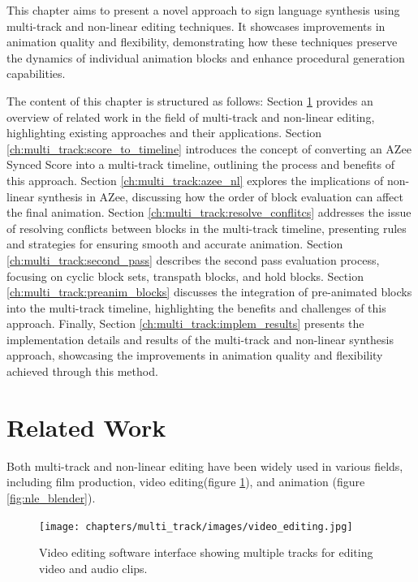 \documentclass[../../main.tex]{subfiles}
\begin{document}
This chapter aims to present a novel approach to sign language synthesis using multi-track and non-linear editing techniques. It showcases improvements in animation quality and flexibility, demonstrating how these techniques preserve the dynamics of individual animation blocks and enhance procedural generation capabilities.

The content of this chapter is structured as follows: Section \ref{ch:multi_track:related_work} provides an overview of related work in the field of multi-track and non-linear editing, highlighting existing approaches and their applications. Section \ref{ch:multi_track:score_to_timeline} introduces the concept of converting an AZee Synced Score into a multi-track timeline, outlining the process and benefits of this approach. Section \ref{ch:multi_track:azee_nl} explores the implications of non-linear synthesis in AZee, discussing how the order of block evaluation can affect the final animation. Section \ref{ch:multi_track:resolve_conflitcs} addresses the issue of resolving conflicts between blocks in the multi-track timeline, presenting rules and strategies for ensuring smooth and accurate animation. Section \ref{ch:multi_track:second_pass} describes the second pass evaluation process, focusing on cyclic block sets, transpath blocks, and hold blocks. Section \ref{ch:multi_track:preanim_blocks} discusses the integration of pre-animated blocks into the multi-track timeline, highlighting the benefits and challenges of this approach. Finally, Section \ref{ch:multi_track:implem_results} presents the implementation details and results of the multi-track and non-linear synthesis approach, showcasing the improvements in animation quality and flexibility achieved through this method.

\section{Related Work}
\label{ch:multi_track:related_work}

Both multi-track and non-linear editing have been widely used in various fields, including film production, video editing(figure \ref{fig:video_edit}), and animation (figure \ref{fig:nle_blender}). 

\begin{figure}[h]
    \centering
    \texttt{[image: chapters/multi\_track/images/video\_editing.jpg]}
    \caption{Video editing software interface showing multiple tracks for editing video and audio clips.}
    \label{fig:video_edit}
\end{figure}
\end{document}
